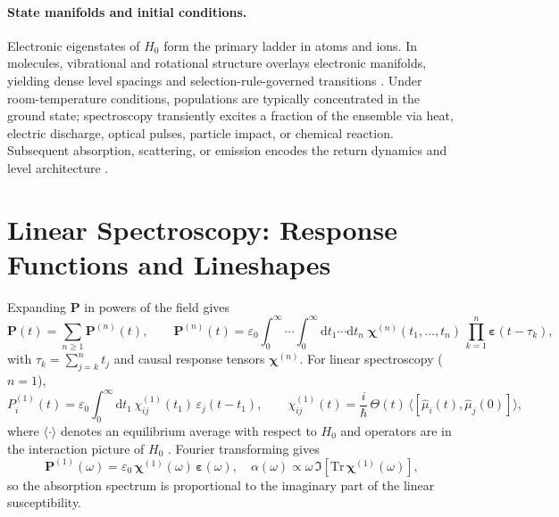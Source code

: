 \paragraph{State manifolds and initial conditions.}
Electronic eigenstates of $H_0$ form the primary ladder in atoms and ions. In molecules, vibrational and rotational structure overlays electronic manifolds, yielding dense level spacings and selection-rule-governed transitions \cite{skoogetal2017principlesinstrumentalanalysis}. Under room-temperature conditions, populations are typically concentrated in the ground state; spectroscopy transiently excites a fraction of the ensemble via heat, electric discharge, optical pulses, particle impact, or chemical reaction. Subsequent absorption, scattering, or emission encodes the return dynamics and level architecture \cite{skoogetal2017principlesinstrumentalanalysis}.

\section{Linear Spectroscopy: Response Functions and Lineshapes}
\label{final:sec:linear}
\noindent
Expanding $\boldsymbol{P}$ in powers of the field gives
\begin{equation}
    \boldsymbol{P}(t)=\sum_{n\ge 1}\boldsymbol{P}^{(n)}(t),\qquad
    \boldsymbol{P}^{(n)}(t)=\varepsilon_0\int_0^\infty\!\!\cdots\!\int_0^\infty\!\!\mathrm{d}t_1\cdots\mathrm{d}t_n\;
    \boldsymbol{\chi}^{(n)}(t_1,\ldots,t_n)\,\prod_{k=1}^n \boldsymbol{\varepsilon}(t-\tau_k),
\end{equation}
with $\tau_k=\sum_{j=k}^n t_j$ and causal response tensors $\boldsymbol{\chi}^{(n)}$. For linear spectroscopy ($n=1$),
\begin{equation}
    P_i^{(1)}(t)=\varepsilon_0\int_0^\infty \mathrm{d}t_1\, \chi^{(1)}_{ij}(t_1)\,\varepsilon_j(t-t_1),
    \qquad
    \chi^{(1)}_{ij}(t)=\frac{i}{\hbar}\,\Theta(t)\,\langle[\hat{\mu}_i(t),\hat{\mu}_j(0)]\rangle,
    \label{final:eq:chi1_comm}
\end{equation}
where $\langle\cdot\rangle$ denotes an equilibrium average with respect to $H_0$ and operators are in the interaction picture of $H_0$ \cite{mukamel1995principlesnonlinearoptical}. Fourier transforming gives
\begin{equation}
    \boldsymbol{P}^{(1)}(\omega)=\varepsilon_0\,\boldsymbol{\chi}^{(1)}(\omega)\,\boldsymbol{\varepsilon}(\omega),\quad
    \alpha(\omega)\propto \omega\,\Im\!\left[\mathrm{Tr}\,\boldsymbol{\chi}^{(1)}(\omega)\right],
\end{equation}
so the absorption spectrum is proportional to the imaginary part of the linear susceptibility.

